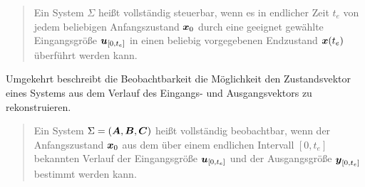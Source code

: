 \begin{quote}
\glqq Ein System $\Sigma$ heißt vollständig steuerbar, wenn es in endlicher Zeit $t_e$ von jedem beliebigen Anfangszustand $\boldsymbol{x}_0$ durch eine geeignet gewählte Eingangsgröße $\boldsymbol{u}_{[0,t_e]}$ in einen beliebig vorgegebenen Endzustand $\boldsymbol{x}(t_e)$ überführt werden kann.\grqq
{}
\end{quote}

Umgekehrt beschreibt die Beobachtbarkeit die Möglichkeit den Zustandsvektor eines Systems aus dem Verlauf des Eingangs- und Ausgangsvektors zu rekonstruieren.

\begin{quote}
\glqq Ein System $\Sigma = (\boldsymbol{A},\boldsymbol{B},\boldsymbol{C})$ heißt vollständig beobachtbar, wenn der Anfangszustand $\boldsymbol{x}_0$ aus dem über einem endlichen Intervall $[0,t_e]$ bekannten Verlauf der Eingangsgröße $\boldsymbol{u}_{[0,t_e]}$ und der Ausgangsgröße $\boldsymbol{y}_{[0,t_e]}$ bestimmt werden kann.\grqq
{}
\end{quote}

